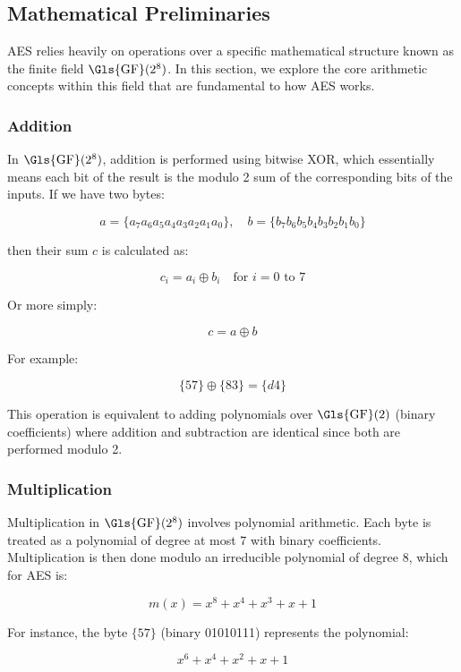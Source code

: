 \subsection{Mathematical Preliminaries}

\Gls{AES} relies heavily on operations over a specific mathematical structure known as the finite field $\mathrm{\Gls{GF}}(2^8)$. In this section, we explore the core arithmetic concepts within this field that are fundamental to how AES works.

\subsubsection{Addition}
\label{sec:addition}

In $\mathrm{\Gls{GF}}(2^8)$, addition is performed using bitwise \Gls{XOR}, which essentially means each bit of the result is the modulo 2 sum of the corresponding bits of the inputs. If we have two bytes:

\[
a = \{a_7a_6a_5a_4a_3a_2a_1a_0\}, \quad b = \{b_7b_6b_5b_4b_3b_2b_1b_0\}
\]

then their sum $c$ is calculated as:

\[
c_i = a_i \oplus b_i \quad \text{for } i = 0 \text{ to } 7
\]

Or more simply:

\[
c = a \oplus b
\]

For example:

\[
\{57\} \oplus \{83\} = \{d4\}
\]

This operation is equivalent to adding polynomials over $\mathrm{\Gls{GF}}(2)$ (binary coefficients) where addition and subtraction are identical since both are performed modulo 2.

\subsubsection{Multiplication}
\label{sec:multiplication}

Multiplication in $\mathrm{\Gls{GF}}(2^8)$ involves polynomial arithmetic. Each byte is treated as a polynomial of degree at most 7 with binary coefficients. Multiplication is then done modulo an irreducible polynomial of degree 8, which for \Gls{AES} is:

\[
m(x) = x^8 + x^4 + x^3 + x + 1
\]

For instance, the byte $\{57\}$ (binary 01010111) represents the polynomial:

\[
x^6 + x^4 + x^2 + x + 1
\]

